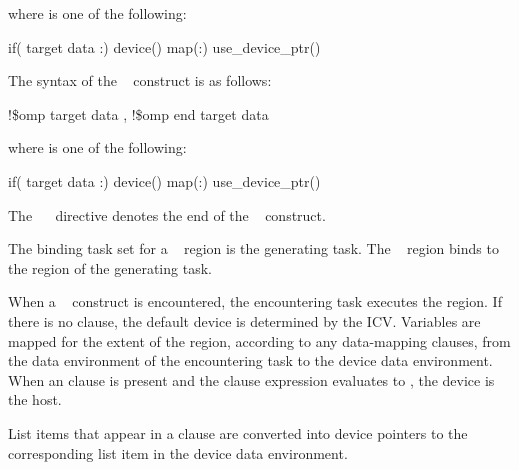 \begin{samepage}
where  is one of the following:

\begin{indentedcodelist}
if(\plc{[} target data :\plc{] scalar-expression})
device()
map(\plc{[[map-type-modifier[,]] map-type}:\plc{ ] list})
use\_device\_ptr()
\end{indentedcodelist}
\ccppspecificend
\medskip
\end{samepage}

\fortranspecificstart
The syntax of the ~ construct is as follows:

\begin{boxedcode}
!\$omp target data \plc{clause[ [ [},\plc{] clause] ... ]}
!\$omp end target data
\end{boxedcode}

where  is one of the following:

\begin{indentedcodelist}
if(\plc{[} target data :\plc{] scalar-logical-expression})
device()
map(\plc{[[map-type-modifier[,]] map-type}:\plc{ ] list})
use\_device\_ptr()
\end{indentedcodelist}

The ~~ directive denotes the end of the ~ construct.
\fortranspecificend

\binding
The binding task set for a ~ region is the generating task. The 
~ region binds to the region of the generating task.

\descr
When a ~ construct is encountered, the encountering task executes the region. If there is no  clause, the default device is determined by the  ICV. Variables are mapped for the extent of the region, according to any data-mapping clauses, from the data environment of the encountering task to the device data environment. When an  clause is present and the  clause expression evaluates to , the device is the host.

List items that appear in a  clause are converted into
device pointers to the corresponding list item in the device data environment.

